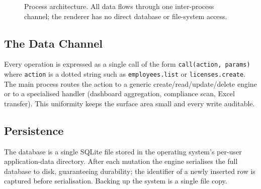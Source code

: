 \documentclass[11pt]{article}
\begin{document}
\begin{figure}[H]
\centering
{}
\caption{Process architecture. All data flows through one inter-process channel; the renderer has
no direct database or file-system access.}
\end{figure}

\subsection{The Data Channel}
Every operation is expressed as a single call of the form \texttt{call(action, params)} where
\texttt{action} is a dotted string such as \texttt{employees.list} or \texttt{licenses.create}. The
main process routes the action to a generic create/read/update/delete engine or to a specialised
handler (dashboard aggregation, compliance scan, Excel transfer). This uniformity keeps the surface
area small and every write auditable.

\subsection{Persistence}
The database is a single SQLite file stored in the operating system's per-user application-data
directory. After each mutation the engine serialises the full database to disk, guaranteeing
durability; the identifier of a newly inserted row is captured before serialisation. Backing up the
system is a single file copy.
\end{document}
